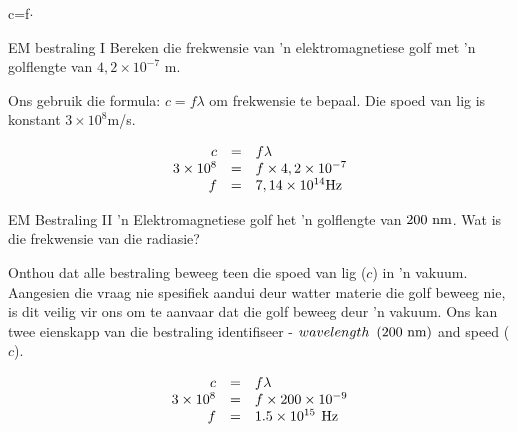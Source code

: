     \begin{Formula}
    c=f\ensuremath{\cdot}\lambda
      \end{Formula}
      \par
            \label{m38777*eip-923}\vspace{.5cm} 
      \noindent
      \begin{wex}{EM bestraling I}{
      \label{m38777*id187899}Bereken die frekwensie van 'n elektromagnetiese golf met 'n golflengte van $4,2\ensuremath{\times}{10}^{-7}$ m.}
      { 
      \label{m38777*id187948}Ons gebruik die formula: $c=f\lambda $ om frekwensie te bepaal. Die spoed van lig is konstant $3\ensuremath{\times}{10}^{8}$m/s.\par 
    \begin{equation}
    \begin{array}{ccc}\hfill c& =& f\lambda \hfill \\ \hfill 3\ensuremath{\times}{10}^{8}& =& f\ensuremath{\times}4,2\ensuremath{\times}{10}^{-7}\hfill \\ \hfill f& =& 7,14\ensuremath{\times}{10}^{14}\text{Hz}\hfill \end{array}
      \end{equation}}    \end{wex}
 
      \begin{wex}{EM Bestraling II}{
      \label{m38777*id188123} 'n Elektromagnetiese golf het 'n golflengte van $200\phantom{\rule{3.33333pt}{0ex}}\text{nm}$. Wat is die frekwensie van die radiasie?}{
      \label{m38777*id188341} Onthou dat alle bestraling beweeg teen die spoed van lig ($c$) in 'n vakuum.
Aangesien die vraag nie spesifiek aandui deur watter materie die golf beweeg nie, is dit veilig vir ons om te aanvaar dat die golf beweeg deur 'n vakuum. 
Ons kan twee eienskapp van die bestraling identifiseer - $wavelength\phantom{\rule{3.33333pt}{0ex}}\left(200\phantom{\rule{3.33333pt}{0ex}}\text{nm}\right)$ and speed ($c$).\par 
    \begin{equation}
    \begin{array}{ccc}\hfill c& =& f\lambda \hfill \\ \hfill 3\ensuremath{\times}{10}^{8}& =& f\ensuremath{\times}200\ensuremath{\times}{10}^{-9}\hfill \\ \hfill f& =& 1.5\ensuremath{\times}{10}^{15}\phantom{\rule{4pt}{0ex}}\text{Hz}\hfill \end{array}
      \end{equation}}    \end{wex}
